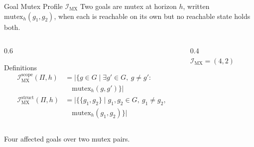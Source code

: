\begin{frame}{Goal Mutex Profile $\mathcal{I}_{\text{MX}}$}
    Two goals are mutex at horizon $h$, written $\text{mutex}_h(g_1, g_2)$, when each is reachable on its own but no reachable state holds both.

    \begin{columns}[T]
        \begin{column}{0.6\textwidth}
            \begin{block}{Definitions}
                \footnotesize
                \begin{align*}
                    \mathcal{I}^{\text{scope}}_{\text{MX}}(\Pi, h)  & = |\{g \in G \mid \exists g' \in G,\ g \neq g' :      \\
                                                                    & \quad \text{mutex}_h(g, g')\}|                        \\
                    \mathcal{I}^{\text{struct}}_{\text{MX}}(\Pi, h) & = |\{\{g_1, g_2\} \mid g_1, g_2 \in G,\ g_1 \neq g_2, \\
                                                                    & \quad \text{mutex}_h(g_1, g_2)\}|
                \end{align*}
            \end{block}
        \end{column}
        \begin{column}{0.4\textwidth}
            \centering
            \\[2pt]
            {\small $\mathcal{I}_{\text{MX}} = (4, 2)$}
        \end{column}
    \end{columns}

    Four affected goals over two mutex pairs.

\end{frame}

